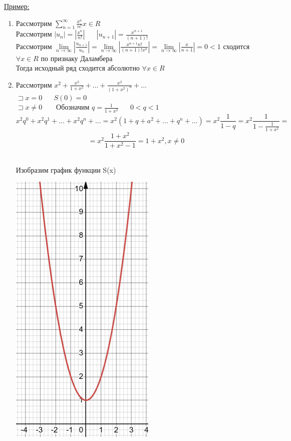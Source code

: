 \documentclass[12pt]{article}
\let\ORIincludegraphics\includegraphics
\renewcommand{\includegraphics}[2][]{\ORIincludegraphics[scale=0.65,#1]{#2}}
\let\oldsum\sum
\let\oldlim\lim
\renewcommand{\sum}{\oldsum\limits}
\renewcommand{\lim}{\oldlim\limits}
\begin{document}
  \underline{Пример:}
  \begin{enumerate}
    \item Рассмотрим $\sum_{n=1}^{\infty} \frac{x^n}{n!} x \in R$ \\
    Рассмотрим $|u_n| = |\frac{x^n}{n!}| \hspace{20pt} |u_{n+1}|=\frac{x^{n+1}}{(n+1)!}$\\
    Рассмотрим $\lim_{n \to \infty} |\frac{u_{n+1}}{u_n}| = \lim_{n \to \infty} |\frac{x^{n+1}n!}{(n+1)!x^n}|=
    \lim_{n \to \infty}|\frac{x}{n+1}| = 0 < 1$ сходится $\forall x \in R$ по признаку Даламбера\\
    Тогда исходный ряд сходится абсолютно $\forall x \in R$
    \item Рассмотрим $x^2+\frac{x^2}{1+x^2}+\dots+\frac{x^2}{(1+x^2)^n}+\dots$\\
    $\sqsupset x=0 \hspace{20pt} S(0)=0$\\
    $\sqsupset x\not = 0 \hspace{20pt} \text{ Обозначим } q = \frac{1}{1+x^2} \hspace{20pt} 0<q<1$
    \[x^2q^0+x^2q^1+\dots+x^2q^n+\dots=x^2(1+q+a^2+\dots+q^n+\dots)=x^2\frac{1}{1-q}=x^2 \frac{1}{1-\frac{1}{1+x^2}}
    =\]
    \[= x^2  \frac{1+x^2}{1+x^2-1}=1+x^2, x \not = 0\]\\
    \pagebreak

    Изобразим график функции S(x)
    \begin{center}
      \includegraphics[scale=0.5]{10.9.1.png}
    \end{center}


\end{enumerate}
\end{document}
